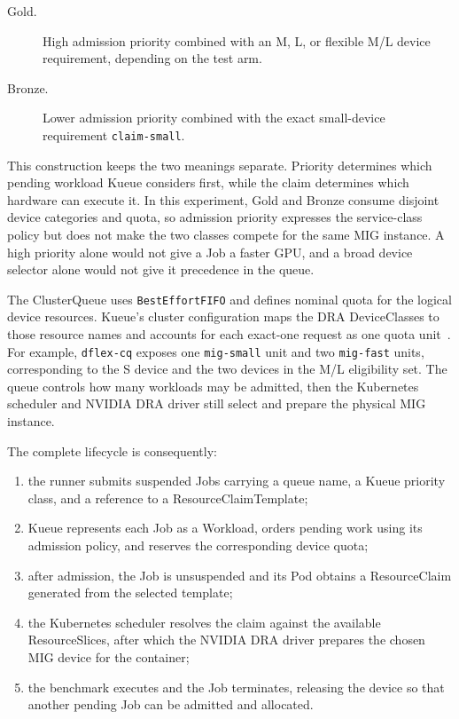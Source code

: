 \begin{description}
    \item[Gold.] High admission priority combined with an M, L, or flexible M/L device requirement, depending on the test arm.
    \item[Bronze.] Lower admission priority combined with the exact small-device requirement \texttt{claim-small}.
\end{description}

This construction keeps the two meanings separate. Priority determines which pending workload Kueue considers first, while the claim determines which hardware can execute it. In this experiment, Gold and Bronze consume disjoint device categories and quota, so admission priority expresses the service-class policy but does not make the two classes compete for the same MIG instance. A high priority alone would not give a Job a faster GPU, and a broad device selector alone would not give it precedence in the queue.

The ClusterQueue uses \texttt{BestEffortFIFO} and defines nominal quota for the logical device resources. Kueue's cluster configuration maps the DRA DeviceClasses to those resource names and accounts for each exact-one request as one quota unit~\cite{kueue2026dra}. For example, \texttt{dflex-cq} exposes one \texttt{mig-small} unit and two \texttt{mig-fast} units, corresponding to the S device and the two devices in the M/L eligibility set. The queue controls how many workloads may be admitted, then the Kubernetes scheduler and NVIDIA DRA driver still select and prepare the physical MIG instance.

The complete lifecycle is consequently:

\begin{enumerate}
    \item the runner submits suspended Jobs carrying a queue name, a Kueue priority class, and a reference to a ResourceClaimTemplate;
    \item Kueue represents each Job as a Workload, orders pending work using its admission policy, and reserves the corresponding device quota;
    \item after admission, the Job is unsuspended and its Pod obtains a ResourceClaim generated from the selected template;
    \item the Kubernetes scheduler resolves the claim against the available ResourceSlices, after which the NVIDIA DRA driver prepares the chosen MIG device for the container;
    \item the benchmark executes and the Job terminates, releasing the device so that another pending Job can be admitted and allocated.
\end{enumerate}

